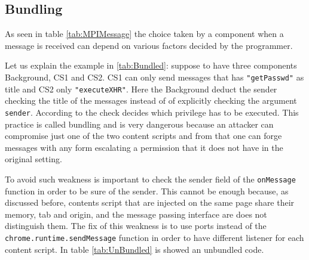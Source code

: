 \subsection{Bundling}
\label{sec:Bundling} 
As seen in table \ref{tab:MPIMessage} the choice taken by a component when a message is received can depend on various factors decided by the programmer.

Let us explain the example in \ref{tab:Bundled}: suppose to have three components Background, CS1 and CS2. CS1 can only send messages that has \texttt{"getPasswd"} as title and CS2 only \texttt{"executeXHR"}. Here the Background deduct the sender checking the title of the messages instead of of explicitly checking the argument \texttt{sender}. According to the check decides which privilege has to be executed. This practice is called bundling and is very dangerous because an attacker can compromise just one of the two content scripts and from that one can forge messages with any form escalating a permission that it does not have in the original setting.

To avoid such weakness is important to check the sender field of the \texttt{onMessage} function in order to be sure of the sender. This cannot be enough because, as discussed before, contents script that are injected on the same page share their memory, tab and origin, and the message passing interface are does not distinguish them. The fix of this weakness is to use ports instead of the \texttt{chrome.runtime.sendMessage} function in order to have different listener for each content script. In table \ref{tab:UnBundled} is showed an unbundled code.

